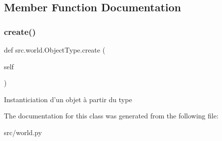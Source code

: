 \subsection{Member Function Documentation}
\hypertarget{classsrc_1_1world_1_1_object_type_a0b0ce8c43e3df2d9c88110c9a0ef262b}{}\label{classsrc_1_1world_1_1_object_type_a0b0ce8c43e3df2d9c88110c9a0ef262b} 
\subsubsection{\texorpdfstring{create()}{create()}}
{\footnotesize\ttfamily def src.\+world.\+Object\+Type.\+create (\begin{DoxyParamCaption}\item[{}]{self }\end{DoxyParamCaption})}

\begin{DoxyVerb}Instanticiation d'un objet à partir du type \end{DoxyVerb}
 

The documentation for this class was generated from the following file\+:\begin{DoxyCompactItemize}
\item 
src/world.\+py\end{DoxyCompactItemize}

